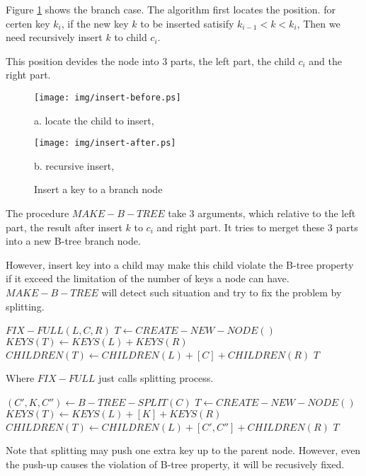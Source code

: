 \documentclass{article}
\begin{document}
Figure \ref{fig:recursive-insert} shows the branch case. The
algorithm first locates the position. for certen key $k_i$,
if the new key $k$ to be inserted satisify $k_{i-1}<k<k_i$,
Then we need recursively insert $k$ to child $c_i$.

This position devides the node into 3 parts, the left part,
the child $c_i$ and the right part.

\begin{figure}[htbp]
       \begin{center}
       	  \texttt{[image: img/insert-before.ps]}

          a. locate the child to insert,

          \texttt{[image: img/insert-after.ps]}

          b. recursive insert, 
        \caption{Insert a key to a branch node} \label{fig:recursive-insert}
       \end{center}
\end{figure}

The procedure $MAKE-B-TREE$ take 3 arguments, which relative to
the left part, the result after insert $k$ to $c_i$ and right part. 
It tries to merget these 3 parts into a new B-tree branch node.

However, insert key into a child may make this child violate the
B-tree property if it exceed the limitation of the number of keys
a node can have. $MAKE-B-TREE$ will detect such situation and try
to fix the problem by splitting.

\begin{algorithmic}[1]
    \State \Return $FIX-FULL(L, C, R)$
  \Else
    \State $T \leftarrow CREATE-NEW-NODE()$
    \State $KEYS(T) \leftarrow KEYS(L) + KEYS(R)$
    \State $CHILDREN(T) \leftarrow CHILDREN(L)+[C]+CHILDREN(R)$
    \State \Return $T$
  \EndIf
\EndFunction
\end{algorithmic}

Where $FIX-FULL$ just calls splitting process.

\begin{algorithmic}[1]
  \State $(C', K, C'') \leftarrow B-TREE-SPLIT(C)$
  \State $T \leftarrow CREATE-NEW-NODE()$
  \State $KEYS(T) \leftarrow KEYS(L)+[K]+KEYS(R)$
  \State $CHILDREN(T) \leftarrow CHILDREN(L)+[C', C'']+CHILDREN(R)$
  \State \Return $T$
\EndFunction
\end{algorithmic}

Note that splitting may push one extra key up to the parent node.
However, even the push-up causes the violation of B-tree property,
it will be recusively fixed.
\end{document}
